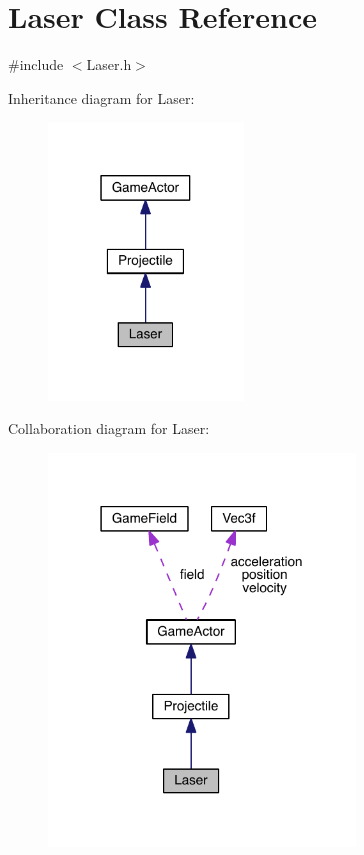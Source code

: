 \hypertarget{class_laser}{\section{Laser Class Reference}
\label{class_laser}
}


{\ttfamily \#include $<$Laser.\+h$>$}



Inheritance diagram for Laser\+:\nopagebreak
\begin{figure}[H]
\begin{center}
\leavevmode
\includegraphics[width=147pt]{class_laser__inherit__graph}
\end{center}
\end{figure}


Collaboration diagram for Laser\+:\nopagebreak
\begin{figure}[H]
\begin{center}
\leavevmode
\includegraphics[width=231pt]{class_laser__coll__graph}
\end{center}
\end{figure}
